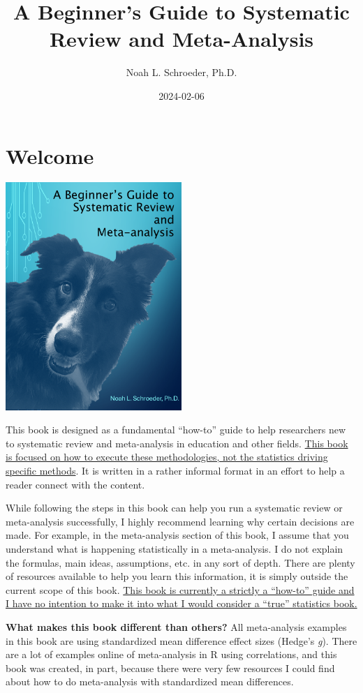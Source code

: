 \documentclass[
]{book}
\title{A Beginner's Guide to Systematic Review and Meta-Analysis}
\author{Noah L. Schroeder, Ph.D.}
\date{2024-02-06}
\begin{document}
\maketitle

{
\setcounter{tocdepth}{1}
\tableofcontents
}
\hypertarget{welcome}{%
\chapter*{Welcome}\label{welcome}}

\includegraphics[width=0.5\textwidth,height=\textheight]{images/cover.png}

This book is designed as a fundamental ``how-to'' guide to help researchers new to systematic review and meta-analysis in education and other fields. \ul{This book is focused on how to execute these methodologies, not the statistics driving specific methods}. It is written in a rather informal format in an effort to help a reader connect with the content.

While following the steps in this book can help you run a systematic review or meta-analysis successfully, I highly recommend learning why certain decisions are made. For example, in the meta-analysis section of this book, I assume that you understand what is happening statistically in a meta-analysis. I do not explain the formulas, main ideas, assumptions, etc. in any sort of depth. There are plenty of resources available to help you learn this information, it is simply outside the current scope of this book. \ul{This book is currently a strictly a ``how-to'' guide and I have no intention to make it into what I would consider a ``true'' statistics book.}

\textbf{What makes this book different than others?} All meta-analysis examples in this book are using standardized mean difference effect sizes (Hedge's \emph{g}). There are a lot of examples online of meta-analysis in R using correlations, and this book was created, in part, because there were very few resources I could find about how to do meta-analysis with standardized mean differences.
\end{document}

